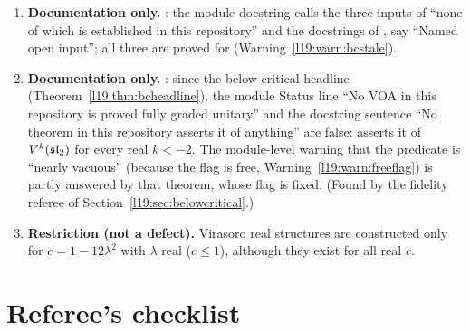 \begin{enumerate}
\item \textbf{Documentation only.} : the module docstring calls the
  three inputs of \allowbreak{}\allowbreak{} ``none of which is established in this
  repository'' and the docstrings of ,  say ``Named open input''; all three
  are proved for  (Warning~\ref{l19:warn:bcstale}).
\item \textbf{Documentation only.} : since the
  below-critical headline (Theorem~\ref{l19:thm:bcheadline}), the module Status line ``No VOA in this repository is proved
  fully graded unitary'' and the  docstring sentence ``No theorem in this repository asserts it of
  anything'' are false: \allowbreak{}\allowbreak{}\allowbreak{}
  asserts it of $V^k(\mathfrak{sl}_2)$ for every real $k<-2$. The module-level warning that the predicate is ``nearly
  vacuous'' (because the flag is free, Warning~\ref{l19:warn:freeflag}) is partly answered by that theorem, whose flag is
  fixed. (Found by the fidelity referee of Section~\ref{l19:sec:belowcritical}.)
\item \textbf{Restriction (not a defect).} Virasoro real structures are constructed only for $c = 1-12\lambda^2$ with
  $\lambda$ real ($c\le1$), although they exist for all real $c$.
\end{enumerate}

\section{Referee's checklist}\label{l19:sec:checklist}

